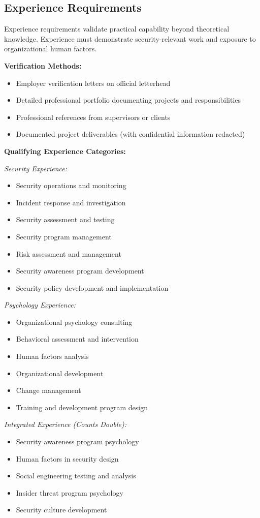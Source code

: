 \documentclass[11pt,a4paper]{article}
\begin{document}
\subsection{Experience Requirements}

Experience requirements validate practical capability beyond theoretical knowledge. Experience must demonstrate security-relevant work and exposure to organizational human factors.

\textbf{Verification Methods:}
\begin{itemize}
\item Employer verification letters on official letterhead
\item Detailed professional portfolio documenting projects and responsibilities
\item Professional references from supervisors or clients
\item Documented project deliverables (with confidential information redacted)
\end{itemize}

\textbf{Qualifying Experience Categories:}

\textit{Security Experience:}
\begin{itemize}
\item Security operations and monitoring
\item Incident response and investigation
\item Security assessment and testing
\item Security program management
\item Risk assessment and management
\item Security awareness program development
\item Security policy development and implementation
\end{itemize}

\textit{Psychology Experience:}
\begin{itemize}
\item Organizational psychology consulting
\item Behavioral assessment and intervention
\item Human factors analysis
\item Organizational development
\item Change management
\item Training and development program design
\end{itemize}

\textit{Integrated Experience (Counts Double):}
\begin{itemize}
\item Security awareness program psychology
\item Human factors in security design
\item Social engineering testing and analysis
\item Insider threat program psychology
\item Security culture development
\end{itemize}
\end{document}
